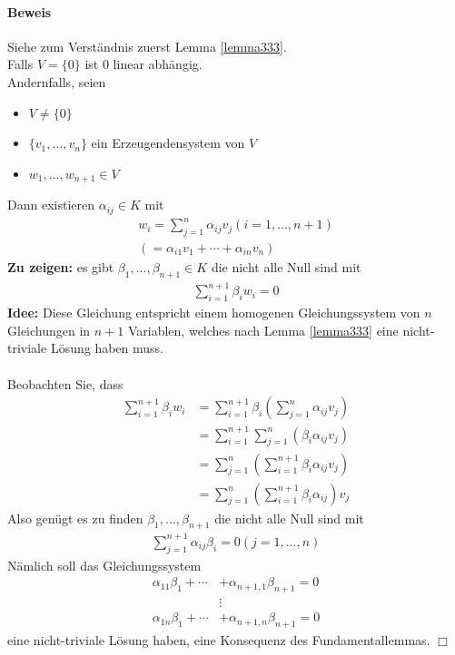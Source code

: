 \documentclass[11pt]{report}
\newcommand*\f[1] {\textbf{#1}}
\begin{document}
\paragraph{Beweis}
Siehe zum Verständnis zuerst Lemma \ref{lemma333}.\\
Falls $V = \{0\}$ ist 0 linear abhängig.\\
Andernfalls, seien
\begin{itemize}
 \item $V \neq \{0\}$
 \item $\{v_1, ..., v_n\}$ ein Erzeugendensystem von $V$
 \item $w_1, ..., w_{n+1} \in V$
\end{itemize}
Dann existieren $\alpha_{ij} \in K$ mit
\begin{align}
 w_i = \sum_{j=1}^{n} \alpha_{ij} v_j (i=1,..., n+1) \\
(= \alpha_{i1} v_1 + \cdots + \alpha_{in} v_n)
\end{align}
\f{Zu zeigen:} es gibt $\beta_1, ..., \beta_{n+1} \in K$ die nicht alle Null sind mit
\begin{align}
 \sum_{i=1}^{n+1} \beta_i w_i = 0
\end{align}
\f{Idee:} Diese Gleichung entspricht einem homogenen Gleichungssystem von $n$ Gleichungen in $n+1$ Variablen, welches nach Lemma \ref{lemma333} eine nicht-triviale Lösung haben muss.\\\\
Beobachten Sie, dass 
\begin{align}
 \sum_{i=1}^{n+1} \beta_i w_i &= \sum_{i=1}^{n+1} \beta_i \left( \sum_{j=1}^{n} \alpha_{ij} v_j \right) \\
 &= \sum_{i=1}^{n+1} \sum_{j=1}^{n} \left( \beta_i \alpha_{ij} v_j \right) \\
 &= \sum_{j=1}^{n} \left( \sum_{i=1}^{n+1} \beta_i \alpha_{ij} v_j \right) \\
 &= \sum_{j=1}^{n} \left( \sum_{i=1}^{n+1} \beta_i \alpha_{ij} \right) v_j
\end{align}
Also genügt es zu finden $\beta_1, ..., \beta_{n+1}$ die nicht alle Null sind mit
\begin{align}
 \sum_{j=1}^{n+1} \alpha_{ij} \beta_i = 0 (j=1, ..., n)
\end{align}
Nämlich soll das Gleichungssystem 
\begin{align}
 \alpha_{11} \beta_1 + \cdots &+ \alpha_{n+1, 1} \beta_{n+1} = 0 \\
&\vdots \\
 \alpha_{1n} \beta_1 + \cdots &+ \alpha_{n+1, n} \beta_{n+1} = 0
\end{align}
eine nicht-triviale Lösung haben, eine Konsequenz des Fundamentallemmas. \hfill $\Box$
\end{document}
